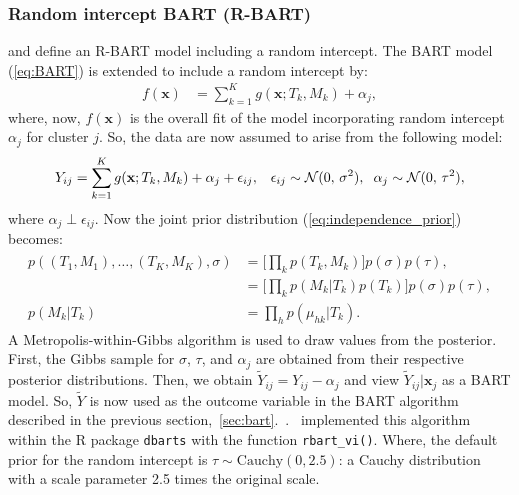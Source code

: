 \documentclass[3p,12pt,a4paper]{elsarticle}
\begin{document}
\subsubsection{Random intercept BART (R-BART)}
\citet{wagner2020,tan2016} and \citet{dorie2024} define an R-BART model including a random intercept. The BART model (\ref{eq:BART}) is extended to include a random intercept by: 
\begin{align} 
    \label{eq:R-BART}
    f(\textbf{x}) &= \sum^{K}_{k=1}g(\textbf{x}; T_{k}, M_{k}) + \alpha_{j}, 
\end{align} where, now, $f(\textbf{x})$ is the overall fit of the model incorporating random intercept $\alpha_{j}$ for cluster $j$. So, the data are now assumed to arise from the following model: 
\begin{align}
    \label{eq:R-BART_model}
    Y_{ij} = \sum^{K}_{k=1}g(\textbf{x}; T_{k}, M_{k}) + \alpha_j + \epsilon_{ij}, & &\epsilon_{ij} \sim \mathcal{N}(0,\,\sigma^{2}), \hspace{.2cm} \alpha_{j} \sim \mathcal{N}(0,\,\tau^{2}),
\end{align} where $\alpha_j \perp \epsilon_{ij}$. Now the joint prior distribution (\ref{eq:independence_prior}) becomes: 
\begin{align}
\begin{split}
    \label{eq:indepdence_prior_rbart}
    p((T_1, M_1), \dots, (T_K, M_K), \sigma) &= \Big[\prod_{k}p(T_k, M_k)\Big]p(\sigma)p(\tau), \\
    &= \Big[\prod_{k}p(M_k|T_k)p(T_k)\Big]p(\sigma)p(\tau), \\
    p(M_k|T_k) &= \prod_{h}p(\mu_{hk}|T_k).
\end{split}
\end{align} 
A Metropolis-within-Gibbs algorithm is used to draw values from the posterior. First, the Gibbs sample for $\sigma$, $\tau$, and $\alpha_j$ are obtained from their respective posterior distributions. Then, we obtain $\tilde{Y}_{ij} = Y_{ij} - \alpha_{j}$ and view $\tilde{Y}_{ij}| \boldsymbol{x}_{j}$ as a BART model. So, $\tilde{Y}$ is now used as the outcome variable in the BART algorithm described in the previous section,~\ref{sec:bart}.~\citep{wagner2020,tan2016}.~\citet{dorie2024} implemented this algorithm within the R package \texttt{dbarts} with the function \texttt{rbart\_vi()}. Where, the default prior for the random intercept is $\tau \sim \text{Cauchy}(0, 2.5)$: a Cauchy distribution with a scale parameter 2.5 times the original scale.
\end{document}
